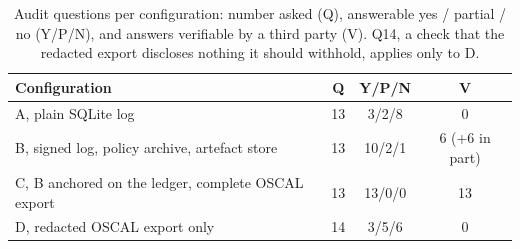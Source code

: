 \begin{table}[t]
\caption{Audit questions per configuration: number asked (Q), answerable yes / partial / no (Y/P/N), and answers verifiable by a third party (V). Q14, a check that the redacted export discloses nothing it should withhold, applies only to D.}
\label{tab:audit}
\footnotesize
\begin{tabularx}{\columnwidth}{@{}Lccc@{}}
\toprule
Configuration & Q & Y/P/N & V \\
\midrule
A, plain SQLite log & 13 & 3/2/8 & 0 \\
B, signed log, policy archive, artefact store & 13 & 10/2/1 & 6 (+6 in part) \\
C, B anchored on the ledger, complete OSCAL export & 13 & 13/0/0 & 13 \\
D, redacted OSCAL export only & 14 & 3/5/6 & 0 \\
\bottomrule
\end{tabularx}
\end{table}
